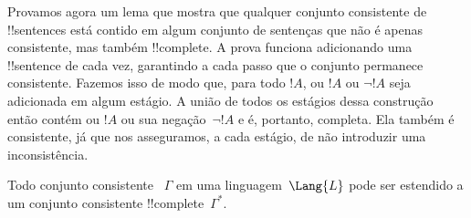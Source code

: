 \documentclass[../../../include/open-logic-section]{subfiles}
\begin{document}
      {}
      {}


\begin{explain}
Provamos agora um lema que mostra que qualquer conjunto consistente de
!!{sentence}s está contido em algum conjunto de sentenças que não é apenas
consistente, mas também !!{complete}. A prova funciona adicionando uma
!!{sentence} de cada vez, garantindo a cada passo que o conjunto permanece
consistente. Fazemos isso de modo que, para todo $!A$, ou $!A$ ou $\lnot
!A$ seja adicionada em algum estágio. A união de todos os estágios dessa
construção então contém ou $!A$ ou sua negação~$\lnot !A$ e
é, portanto, completa. Ela também é consistente, já que nos asseguramos, a cada
estágio, de não introduzir uma inconsistência.
\end{explain}

\begin{lem}
 Todo conjunto consistente
~$\Gamma$ em uma linguagem~$\Lang{L}$ pode ser
estendido a um conjunto consistente !!{complete}~$\Gamma^*$.
\end{lem}
\end{document}
